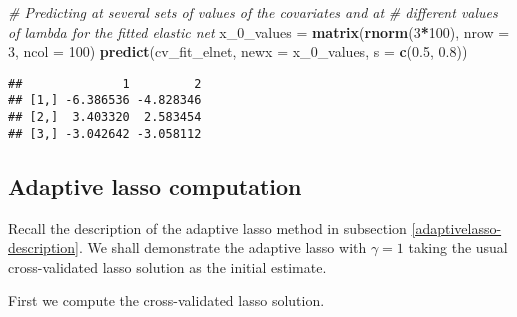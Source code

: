 \documentclass[
]{book}
\newenvironment{Shaded}{\begin{snugshade}}{\end{snugshade}}
\newcommand{\CommentTok}[1]{\textcolor[rgb]{0.56,0.35,0.01}{\textit{#1}}}
\newcommand{\DataTypeTok}[1]{\textcolor[rgb]{0.13,0.29,0.53}{#1}}
\newcommand{\DecValTok}[1]{\textcolor[rgb]{0.00,0.00,0.81}{#1}}
\newcommand{\FloatTok}[1]{\textcolor[rgb]{0.00,0.00,0.81}{#1}}
\newcommand{\KeywordTok}[1]{\textcolor[rgb]{0.13,0.29,0.53}{\textbf{#1}}}
\newcommand{\NormalTok}[1]{#1}
\newcommand{\OperatorTok}[1]{\textcolor[rgb]{0.81,0.36,0.00}{\textbf{#1}}}
\newcommand{\StringTok}[1]{\textcolor[rgb]{0.31,0.60,0.02}{#1}}
\begin{document}
\begin{Shaded}
\begin{Highlighting}[]
\CommentTok{# Predicting at several sets of values of the covariates and at}
\CommentTok{# different values of lambda for the fitted elastic net}
\NormalTok{x_}\DecValTok{0}\NormalTok{_values =}\StringTok{ }\KeywordTok{matrix}\NormalTok{(}\KeywordTok{rnorm}\NormalTok{(}\DecValTok{3}\OperatorTok{*}\DecValTok{100}\NormalTok{), }\DataTypeTok{nrow =} \DecValTok{3}\NormalTok{, }\DataTypeTok{ncol =} \DecValTok{100}\NormalTok{)}
\KeywordTok{predict}\NormalTok{(cv_fit_elnet, }\DataTypeTok{newx =}\NormalTok{ x_}\DecValTok{0}\NormalTok{_values, }\DataTypeTok{s =} \KeywordTok{c}\NormalTok{(}\FloatTok{0.5}\NormalTok{, }\FloatTok{0.8}\NormalTok{))}
\end{Highlighting}
\end{Shaded}

\begin{verbatim}
##              1         2
## [1,] -6.386536 -4.828346
## [2,]  3.403320  2.583454
## [3,] -3.042642 -3.058112
\end{verbatim}

\hypertarget{adaptivelasso-computation}{%
\subsection{Adaptive lasso computation}\label{adaptivelasso-computation}}

Recall the description of the adaptive lasso method in subsection \ref{adaptivelasso-description}. We shall demonstrate the adaptive lasso with \(\gamma = 1\) taking the usual cross-validated lasso solution as the initial estimate.

First we compute the cross-validated lasso solution.
\end{document}
